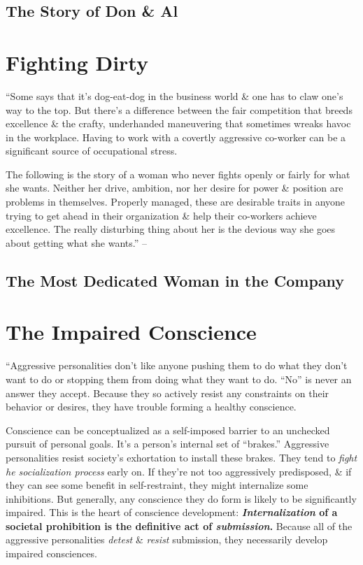\documentclass{article}
\numberwithin{equation}{section}
\begin{document}
\subsection{The Story of Don \& Al}


\section{Fighting Dirty}
``Some says that it's dog-eat-dog in the business world \& one has to claw one's way to the top. But there's a difference between the fair competition that breeds excellence \& the crafty, underhanded maneuvering that sometimes wreaks havoc in the workplace. Having to work with a covertly aggressive co-worker can be a significant source of occupational stress.

The following is the story of a woman who never fights openly or fairly for what she wants. Neither her drive, ambition, nor her desire for power \& position are problems in themselves. Properly managed, these are desirable traits in anyone trying to get ahead in their organization \& help their co-workers achieve excellence. The really disturbing thing about her is the devious way she goes about getting what she wants.'' -- \cite[p. 63]{Simon2010}

\subsection{The Most Dedicated Woman in the Company}


\section{The Impaired Conscience}
``Aggressive personalities don't like anyone pushing them to do what they don't want to do or stopping them from doing what they want to do. ``No'' is never an answer they accept. Because they so actively resist any constraints on their behavior or desires, they have trouble forming a healthy conscience.

Conscience can be conceptualized as a self-imposed barrier to an unchecked pursuit of personal goals. It's a person's internal set of ``brakes.'' Aggressive personalities resist society's exhortation to install these brakes. They tend to \textit{fight he socialization process} early on. If they're not too aggressively predisposed, \& if they can see some benefit in self-restraint, they might internalize some inhibitions. But generally, any conscience they do form is likely to be significantly impaired. This is the heart of conscience development: \textbf{\textit{Internalization} of a societal prohibition is the definitive act of \textit{submission}.} Because all of the aggressive personalities \textit{detest} \& \textit{resist} submission, they necessarily develop impaired consciences.
\end{document}
